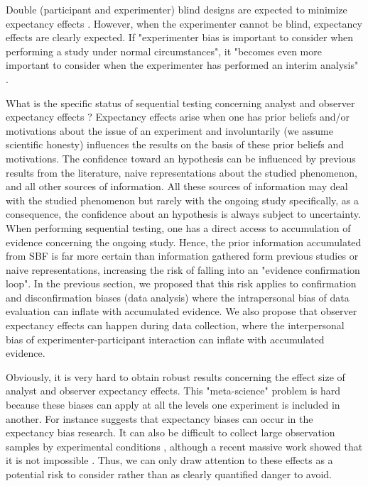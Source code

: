 \documentclass[a4paper,man,natbib,floatsintext,donotrepeattitle]{apa6}
\begin{document}
Double (participant and experimenter) blind designs are expected to minimize expectancy effects \citep{klein_low_2012,gilder_role_2018}. However, when the experimenter cannot be blind, expectancy effects are clearly expected. If "experimenter bias is important to consider when
performing a study under normal circumstances", it "becomes even more important to consider
when the experimenter has performed an interim analysis" \cite{lakens_performing_2014}. \par

What is the specific status of sequential testing concerning analyst and observer expectancy effects ? Expectancy effects arise when one has prior beliefs and/or motivations about the issue of an experiment and involuntarily (we assume scientific honesty) influences the results on the basis of these prior beliefs and motivations. The confidence toward an hypothesis can be influenced by previous results from the literature, naive representations about the studied phenomenon, and all other sources of information. All these sources of information may deal with the studied phenomenon but rarely with the ongoing study specifically, as a consequence, the confidence about an hypothesis is always subject to uncertainty. When performing sequential testing, one has a direct access to accumulation of evidence concerning the ongoing study. Hence, the prior information accumulated from SBF is far more certain than information gathered form previous studies or naive representations, increasing the risk of falling into an "evidence confirmation loop". In the previous section, we proposed that this risk applies to confirmation and disconfirmation biases (data analysis) where the intrapersonal bias of data evaluation can inflate with accumulated evidence. We also propose that observer expectancy effects can happen during data collection, where the interpersonal bias of experimenter-participant interaction can inflate with accumulated evidence. 

Obviously, it is very hard to obtain robust results concerning the effect size of analyst and observer expectancy effects. This "meta-science" problem is hard because these biases can apply at all the levels one experiment is included in another. For instance \cite{barber_expecting_1978} suggests that expectancy biases can occur in the expectancy bias research. It can also be difficult to collect large observation samples by experimental conditions \citep[e.g.,][]{zoble_interaction_1969}, although a recent massive work showed that it is not impossible \citep {gilder_role_2018}. Thus, we can only draw attention to these effects as a potential risk to consider rather than as clearly quantified danger to avoid.
\end{document}

